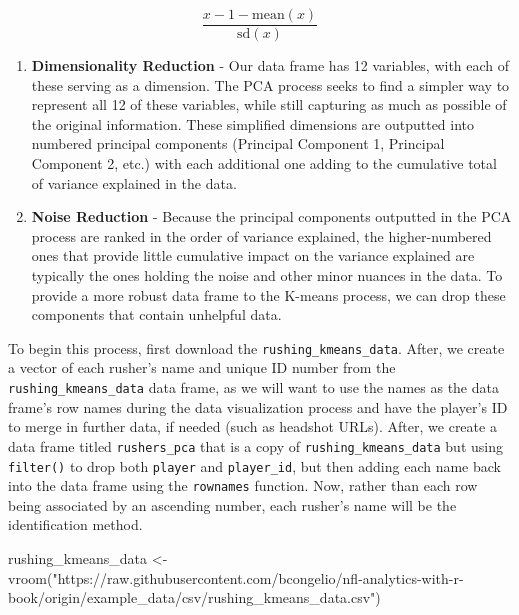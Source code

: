 \documentclass[
  letterpaper,
]{krantz}
\newenvironment{Shaded}{\begin{snugshade}}{\end{snugshade}}
\newcommand{\FunctionTok}[1]{\textcolor[rgb]{0.28,0.35,0.67}{#1}}
\newcommand{\NormalTok}[1]{\textcolor[rgb]{0.00,0.23,0.31}{#1}}
\newcommand{\OtherTok}[1]{\textcolor[rgb]{0.00,0.23,0.31}{#1}}
\newcommand{\StringTok}[1]{\textcolor[rgb]{0.13,0.47,0.30}{#1}}
\providecommand{\tightlist}{%
  \setlength{\itemsep}{0pt}\setlength{\parskip}{0pt}}\usepackage{longtable,booktabs,array}
\begin{document}
\[
\frac{x-1 - \text{mean}(x)}{\text{sd}(x)}
\]

\begin{enumerate}
\def\labelenumi{\arabic{enumi}.}
\setcounter{enumi}{1}
\tightlist
\item
  \textbf{Dimensionality Reduction} - Our data frame has 12 variables,
  with each of these serving as a dimension. The PCA process seeks to
  find a simpler way to represent all 12 of these variables, while still
  capturing as much as possible of the original information. These
  simplified dimensions are outputted into numbered principal components
  (Principal Component 1, Principal Component 2, etc.) with each
  additional one adding to the cumulative total of variance explained in
  the data.
\item
  \textbf{Noise Reduction} - Because the principal components outputted
  in the PCA process are ranked in the order of variance explained, the
  higher-numbered ones that provide little cumulative impact on the
  variance explained are typically the ones holding the noise and other
  minor nuances in the data. To provide a more robust data frame to the
  K-means process, we can drop these components that contain unhelpful
  data.
\end{enumerate}

To begin this process, first download the
\texttt{rushing\_kmeans\_data}. After, we create a vector of each
rusher's name and unique ID number from the
\texttt{rushing\_kmeans\_data} data frame, as we will want to use the
names as the data frame's row names during the data visualization
process and have the player's ID to merge in further data, if needed
(such as headshot URLs). After, we create a data frame titled
\texttt{rushers\_pca} that is a copy of \texttt{rushing\_kmeans\_data}
but using \texttt{filter()} to drop both \texttt{player} and
\texttt{player\_id}, but then adding each name back into the data frame
using the \texttt{rownames} function. Now, rather than each row being
associated by an ascending number, each rusher's name will be the
identification method.

\begin{Shaded}
\begin{Highlighting}[]
\NormalTok{rushing\_kmeans\_data }\OtherTok{\textless{}{-}}
  \FunctionTok{vroom}\NormalTok{(}\StringTok{"https://raw.githubusercontent.com/bcongelio/nfl{-}analytics{-}with{-}r{-}book/origin/example\_data/csv/rushing\_kmeans\_data.csv"}\NormalTok{)}
\end{Highlighting}
\end{Shaded}
\end{document}
